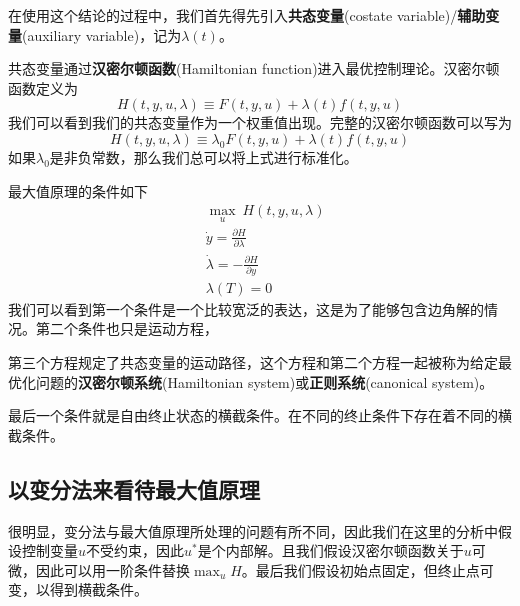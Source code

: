 \documentclass[UTF8,12pt]{ctexart}
\numberwithin{equation}{section} %
\numberwithin{figure}{section}
\numberwithin{table}{section}
\begin{document}
	在使用这个结论的过程中，我们首先得先引入\textbf{共态变量}(costate variable)/\textbf{辅助变量}(auxiliary variable)，记为$\lambda(t)$。
	
	共态变量通过\textbf{汉密尔顿函数}(Hamiltonian function)进入最优控制理论。汉密尔顿函数定义为
	\begin{equation}
		H(t,y,u,\lambda) \equiv F(t,y,u) + \lambda(t)f(t,y,u)
	\end{equation}
	我们可以看到我们的共态变量作为一个权重值出现。完整的汉密尔顿函数可以写为
	\begin{equation}
		H(t,y,u,\lambda) \equiv \lambda_0F(t,y,u) + \lambda(t)f(t,y,u)
	\end{equation}
	如果$\lambda_0$是非负常数，那么我们总可以将上式进行标准化。
	
	最大值原理的条件如下
	\begin{equation}
		\begin{aligned}
			& \max_{u} \ H(t,y,u,\lambda) \\
			& \dot{y} = \frac{\partial H}{\partial \lambda} \\
			& \dot{\lambda} = - \frac{\partial H}{\partial y} \\
			& \lambda(T) = 0
		\end{aligned}
	\end{equation}
	我们可以看到第一个条件是一个比较宽泛的表达，这是为了能够包含边角解的情况。第二个条件也只是运动方程，
	
	第三个方程规定了共态变量的运动路径，这个方程和第二个方程一起被称为给定最优化问题的\textbf{汉密尔顿系统}(Hamiltonian system)或\textbf{正则系统}(canonical system)。
	
	最后一个条件就是自由终止状态的横截条件。在不同的终止条件下存在着不同的横截条件。
	
	\subsection{以变分法来看待最大值原理}
	很明显，变分法与最大值原理所处理的问题有所不同，因此我们在这里的分析中假设控制变量$u$不受约束，因此$u^*$是个内部解。且我们假设汉密尔顿函数关于$u$可微，因此可以用一阶条件替换$\max_{u}H$。最后我们假设初始点固定，但终止点可变，以得到横截条件。
	
\end{document}
